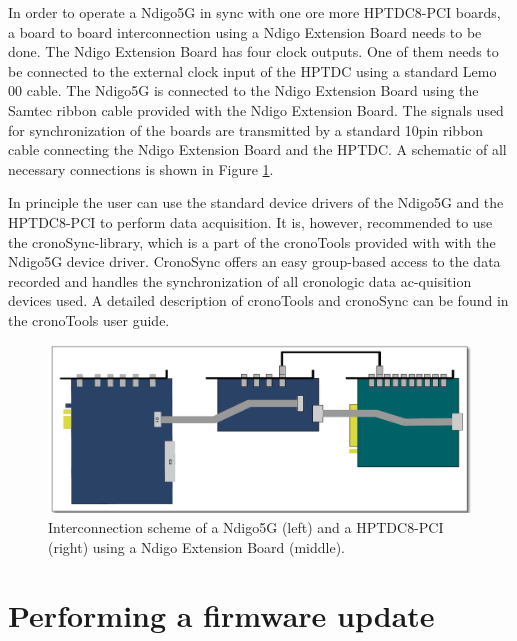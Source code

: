         In order to operate a Ndigo5G in sync with one ore more HPTDC8-PCI boards, a board to board interconnection using a Ndigo Extension Board needs to be done. The Ndigo Extension Board has four clock outputs. One of them needs to be connected to the external clock input of the HPTDC using a standard Lemo 00 cable. The Ndigo5G is connected to the Ndigo Extension Board using the Samtec ribbon cable provided with the Ndigo Extension Board. The signals used for synchronization of the boards are transmitted by a standard 10pin ribbon cable connecting the Ndigo Extension Board and the HPTDC. A schematic of all necessary connections is shown in Figure \ref{fig:InterconNdigo}.\par

        In principle the user can use the standard device drivers of the Ndigo5G and the HPTDC8-PCI to perform data acquisition. It is, however, recommended to use the cronoSync-library, which is a part of the cronoTools provided with with the Ndigo5G device driver. CronoSync offers an easy group-based access to the data recorded and handles the synchronization of all cronologic data ac-quisition devices used. A detailed description of cronoTools and cronoSync can be found in the cronoTools user guide.

        \begin{figure}[hb]
            \begin{center}
                \includegraphics[width=\textwidth]{figures/InterconNdigo.pdf}
                \caption{\label{fig:InterconNdigo} Interconnection scheme of a Ndigo5G (left) and a HPTDC8-PCI (right) using a Ndigo Extension Board (middle).}
            \end{center}
        \end{figure}
    
    \section{Performing a firmware update}
    
